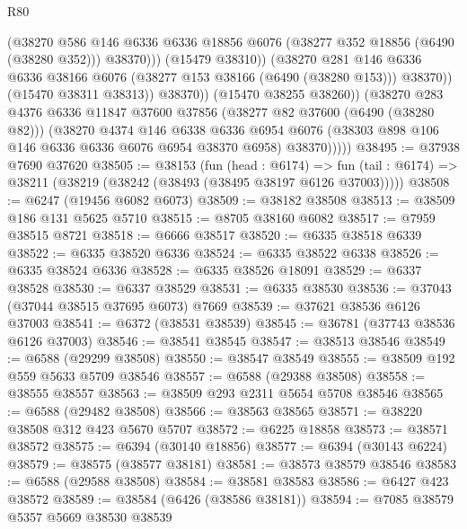 \begin{lexlean}{R80}
\begin{coremodule}
                          (@38270
                            @586
                            @146
                            @6336
                            @6336
                            @18856
                            @6076
                            (@38277 @352 @18856 (@6490 (@38280 @352)))
                            @38370)))
                      (@15479 @38310))
                    (@38270
                      @281
                      @146
                      @6336
                      @6336
                      @38166
                      @6076
                      (@38277 @153 @38166 (@6490 (@38280 @153)))
                      @38370))
                  (@15470 @38311 @38313))
                @38370))
            (@15470 @38255 @38260))
          (@38270
            @283
            @4376
            @6336
            @11847
            @37600
            @37856
            (@38277 @82 @37600 (@6490 (@38280 @82)))
            (@38270
              @4374
              @146
              @6338
              @6336
              @6954
              @6076
              (@38303 @898 @106 @146 @6336 @6336 @6076 @6954 @38370 @6958)
              @38370)))))
@38495 := @37938 @7690 @37620
@38505 := @38153
    (fun (head : @6174) =>
    fun (tail : @6174) => @38211 (@38219 (@38242 (@38493 (@38495 @38197 @6126 @37003)))))
@38508 := @6247 (@19456 @6082 @6073)
@38509 := @38182 @38508
@38513 := @38509 @186 @131 @5625 @5710
@38515 := @8705 @38160 @6082
@38517 := @7959 @38515 @8721
@38518 := @6666 @38517
@38520 := @6335 @38518 @6339
@38522 := @6335 @38520 @6336
@38524 := @6335 @38522 @6338
@38526 := @6335 @38524 @6336
@38528 := @6335 @38526 @18091
@38529 := @6337 @38528
@38530 := @6337 @38529
@38531 := @6335 @38530
@38536 := @37043 (@37044 @38515 @37695 @6073) @7669
@38539 := @37621 @38536 @6126 @37003
@38541 := @6372 (@38531 @38539)
@38545 := @36781 (@37743 @38536 @6126 @37003)
@38546 := @38541 @38545
@38547 := @38513 @38546
@38549 := @6588 (@29299 @38508)
@38550 := @38547 @38549
@38555 := @38509 @192 @559 @5633 @5709 @38546
@38557 := @6588 (@29388 @38508)
@38558 := @38555 @38557
@38563 := @38509 @293 @2311 @5654 @5708 @38546
@38565 := @6588 (@29482 @38508)
@38566 := @38563 @38565
@38571 := @38220 @38508 @312 @423 @5670 @5707
@38572 := @6225 @18858
@38573 := @38571 @38572
@38575 := @6394 (@30140 @18856)
@38577 := @6394 (@30143 @6224)
@38579 := @38575 (@38577 @38181)
@38581 := @38573 @38579 @38546
@38583 := @6588 (@29588 @38508)
@38584 := @38581 @38583
@38586 := @6427 @423 @38572
@38589 := @38584 (@6426 (@38586 @38181))
@38594 := @7085 @38579 @5357 @5669 @38530 @38539

\end{coremodule}
\end{lexlean}
